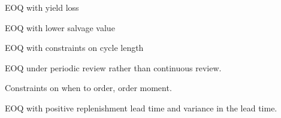 \begin{exercise}
EOQ with yield loss
  \begin{comment}
    TBD
  \end{comment}
\end{exercise}

\begin{exercise}
EOQ with lower salvage value
  \begin{comment}
    TBD
  \end{comment}
\end{exercise}


\begin{exercise}
EOQ with constraints on cycle length

EOQ under periodic review rather than continuous review.

Constraints on when to order, order moment.

  \begin{comment}
    TBD
  \end{comment}
\end{exercise}


\begin{exercise}
  EOQ with positive replenishment lead time and variance in the lead
  time.

  \begin{comment}
    TBD

Suddenly we have to deal with safety stock!
  \end{comment}
\end{exercise}

